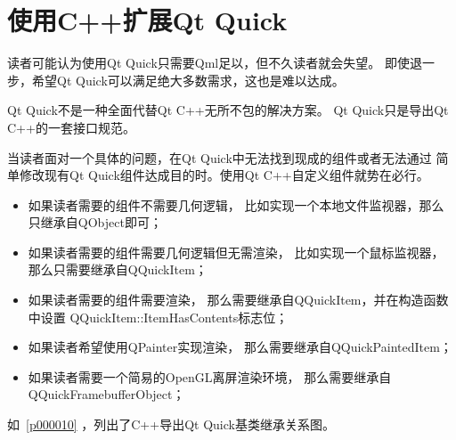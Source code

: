 ﻿




\FloatBarrier
\section{
使用C{\sourcefonttwo{}+}{\sourcefonttwo{}+}扩展Qt Quick
}\label{s100710}


读者可能认为使用Qt Quick只需要Qml足以，但不久读者就会失望。
即使退一步，希望Qt Quick可以满足绝大多数需求，这也是难以达成。

Qt Quick不是一种全面代替Qt C{\sourcefonttwo{}+}{\sourcefonttwo{}+}无所不包的解决方案。
Qt Quick只是导出Qt C{\sourcefonttwo{}+}{\sourcefonttwo{}+}的一套接口规范。

当读者面对一个具体的问题，在Qt Quick中无法找到现成的组件或者无法通过
简单修改现有Qt Quick组件达成目的时。使用Qt C{\sourcefonttwo{}+}{\sourcefonttwo{}+}自定义组件就势在必行。

\begin{itemize}

\item 如果读者需要的组件不需要几何逻辑，
比如实现一个本地文件监视器，那么只继承自QObject即可；

\item 如果读者需要的组件需要几何逻辑但无需渲染，
比如实现一个鼠标监视器，那么只需要继承自QQuickItem；

\item 如果读者需要的组件需要渲染，
那么需要继承自QQuickItem，并在构造函数中设置
QQuickItem::ItemHasContents标志位；

\item 如果读者希望使用QPainter实现渲染，
那么需要继承自QQuickPaintedItem；

\item 如果读者需要一个简易的OpenGL离屏渲染环境，
那么需要继承自QQuickFramebufferObject；

\end{itemize}

如\figurename\ \ref{p000010}
，列出了C{\sourcefonttwo{}+}{\sourcefonttwo{}+}导出Qt Quick基类继承关系图。



